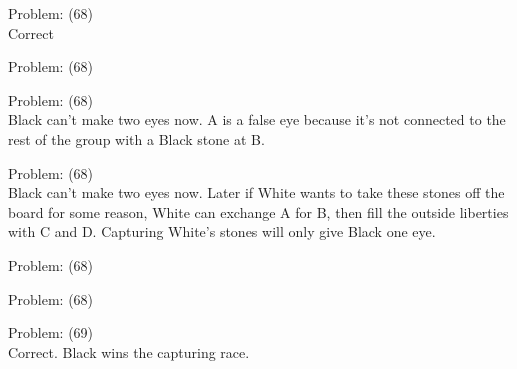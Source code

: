 \documentclass[11pt]{article}
\begin{document}
\begin{minipage}[t]{0.5\textwidth}
  {\centering
  
Problem: (68)\\
Correct\\
  }
\end{minipage}
\begin{minipage}[t]{0.5\textwidth}
  {\centering
  
Problem: (68)\\
  }
\end{minipage}
\begin{minipage}[t]{0.5\textwidth}
  {\centering
  
Problem: (68)\\
Black can't make two eyes now. A is a false eye because it's not connected to the rest of the group with a Black stone at B.\\
  }
\end{minipage}
\begin{minipage}[t]{0.5\textwidth}
  {\centering
  
Problem: (68)\\
Black can't make two eyes now. Later if White wants to take these stones off the board for some reason, White can exchange A for B, then fill the outside liberties with C and D. Capturing White's stones will only give Black one eye.\\
  }
\end{minipage}
\begin{minipage}[t]{0.5\textwidth}
  {\centering
  
Problem: (68)\\
  }
\end{minipage}
\begin{minipage}[t]{0.5\textwidth}
  {\centering
  
Problem: (68)\\
  }
\end{minipage}
\begin{minipage}[t]{0.5\textwidth}
  {\centering
  
Problem: (69)\\
Correct. Black wins the capturing race.\\
  }
\end{minipage}
\end{document}
